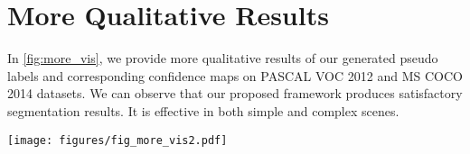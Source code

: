 \documentclass[10pt,twocolumn,letterpaper]{article}
\begin{document}
\section{More Qualitative Results}
In \cref{fig:more_vis}, we provide more qualitative results of our generated pseudo labels and corresponding confidence maps on PASCAL VOC 2012 and MS COCO 2014 datasets. We can observe that our proposed framework produces satisfactory segmentation results. It is effective in both simple and complex scenes.



\begin{figure*}[h]
\vspace{2mm}
  \centering
\texttt{[image: figures/fig\_more\_vis2.pdf]}

   \caption{More visualizations on PASCAL VOC 2012 and MS COCO 2014 datasets.
   }
   \label{fig:more_vis}
   \vspace{2mm}
\end{figure*}
\end{document}
